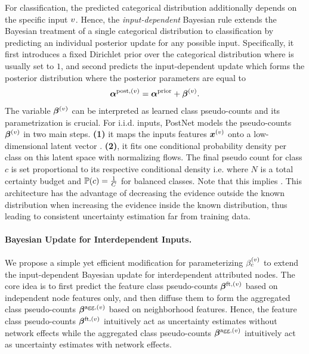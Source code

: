 For classification, the predicted categorical distribution \smash{$\hat{\y} \nodeidxv \sim \DCat(\p\nodeidxv)$} additionally depends on the specific input $v$. Hence, the \emph{input-dependent} Bayesian rule \citep{charpentier2020, NatPN2021} extends the Bayesian treatment of a single categorical distribution to classification by predicting an individual posterior update for any possible input. Specifically, it first introduces a fixed Dirichlet prior over the categorical distribution  where  is usually set to $1$, and second predicts the input-dependent update \smash{$\vbeta\nodeidxv$} which forms the posterior distribution  where the posterior parameters are equal to
\begin{align}\label{eq:input-posterior-update}
    \bm{\alpha}^{\text{post}, (v)} = \bm{\alpha}^\text{prior} + \bm{\beta}^{(v)}.
\end{align}
The variable $\vbeta\nodeidxv$ can be interpreted as learned class pseudo-counts and its parametrization is crucial. For i.i.d. inputs, PostNet \citep{charpentier2020} models the pseudo-counts $\vbeta\nodeidxv$ in two main steps. \textbf{(1)} it maps the inputs features $\bm{x}^{(v)}$ onto a low-dimensional latent vector . \textbf{(2)}, it fits one conditional probability density \smash{$\prob(\z\nodeidxv|\iclass; \vphi)$} per class on this latent space with normalizing flows. The final pseudo count for class $c$ is set proportional to its respective conditional density i.e.  where $N$ is a total certainty budget and $\operatorname{\mathbb{P}}(c)= \frac{1}{C}$ for balanced classes. Note that this implies . This architecture has the advantage of decreasing the evidence outside the known distribution when increasing the evidence inside the known distribution, thus leading to consistent uncertainty estimation far from training data.

\paragraph{Bayesian Update for Interdependent Inputs.} We propose a simple yet efficient modification for parameterizing $\beta_c^{(v)}$ to extend the input-dependent Bayesian update for interdependent attributed nodes. The core idea is to first predict the feature class pseudo-counts $\bm{\beta}^{\text{ft}, (v)}$ based on independent node features only, and then diffuse them to form the aggregated class pseudo-counts $\bm{\beta}^{\text{agg}, (v)}$ based on neighborhood features. Hence, the feature class pseudo-counts $\bm{\beta}^{\text{ft}, (v)}$ intuitively act as uncertainty estimates without network effects while the aggregated class pseudo-counts $\bm{\beta}^{\text{agg}, (v)}$ intuitively act as uncertainty estimates with network effects. 

